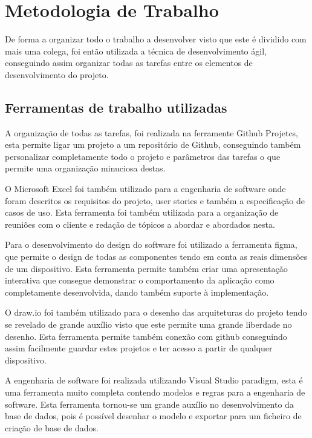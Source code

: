 
\chapter{Metodologia de Trabalho}
De forma a organizar todo o trabalho a desenvolver visto que este é dividido com mais uma colega, 
foi então utilizada a técnica de desenvolvimento ágil, conseguindo assim organizar todas as tarefas 
entre os elementos de desenvolvimento do projeto.

\section{Ferramentas de trabalho utilizadas}

A organização de todas as tarefas, foi realizada na ferramente Github Projetcs, esta 
permite ligar um projeto a um repositório de Github, conseguindo também personalizar completamente todo 
o projeto e parâmetros das tarefas o que permite uma organização minuciosa destas.

O Microsoft Excel foi também utilizado para a engenharia de software onde foram descritos os requisitos 
do projeto, user stories e também a especificação de casos de uso. Esta ferramenta foi também utilizada 
para a organização de reuniões com o cliente e redação de tópicos a abordar e abordados nesta.

Para o desenvolvimento do design do software foi utilizado a ferramenta figma, que permite o design de 
todas as componentes tendo em conta as reais dimensões de um dispositivo. Esta ferramenta 
permite também criar uma apresentação interativa que consegue demonstrar o comportamento da aplicação 
como completamente desenvolvida, dando também suporte à implementação.

O draw.io foi também utilizado para o desenho das arquiteturas do projeto tendo se revelado de grande auxílio 
visto que este permite uma grande liberdade no desenho. Esta ferramenta permite também 
conexão com github conseguindo assim facilmente guardar estes projetos e ter acesso a partir de qualquer 
dispositivo.

A engenharia de software foi realizada utilizando Visual Studio paradigm, esta é uma ferramenta muito 
completa contendo modelos e regras para a engenharia de software. Esta ferramenta tornou-se um grande 
auxílio no desenvolvimento da base de dados, pois é possível desenhar o modelo e exportar para um ficheiro 
de criação de base de dados.


